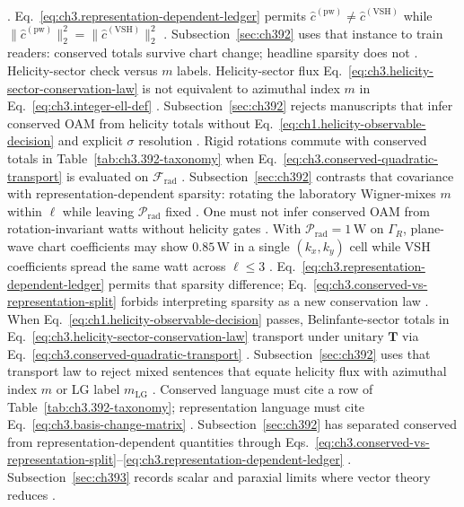\cite{hansen1988}. Eq.~\eqref{eq:ch3.representation-dependent-ledger} permits \(\widehat{c}^{(\mathrm{pw})}\neq\widehat{c}^{(\mathrm{VSH})}\) while \(\|\widehat{c}^{(\mathrm{pw})}\|_{2}^{2}=\|\widehat{c}^{(\mathrm{VSH})}\|_{2}^{2}\)
\cite{poynting1884}. Subsection~\ref{sec:ch392} uses that instance to train readers: conserved totals survive chart change; headline sparsity does not
\cite{belinfante1940}.
Helicity-sector check versus $m$ labels. Helicity-sector flux Eq.~\eqref{eq:ch3.helicity-sector-conservation-law} is not equivalent to azimuthal index \(m\) in Eq.~\eqref{eq:ch3.integer-ell-def}
\cite{belinfante1940}. Subsection~\ref{sec:ch392} rejects manuscripts that infer conserved OAM from helicity totals without Eq.~\eqref{eq:ch1.helicity-observable-decision} and explicit \(\sigma\) resolution
\cite{harrington2001}.
Rigid rotations commute with conserved totals in Table~\ref{tab:ch3.392-taxonomy} when Eq.~\eqref{eq:ch3.conserved-quadratic-transport} is evaluated on \(\mathcal{F}_{\mathrm{rad}}\)
\cite{belinfante1940}. Subsection~\ref{sec:ch392} contrasts that covariance with representation-dependent sparsity: rotating the laboratory Wigner-mixes \(m\) within \(\ell\) while leaving \(\mathcal{P}_{\mathrm{rad}}\) fixed
\cite{hansen1988}. One must not infer conserved OAM from rotation-invariant watts without helicity gates
\cite{belinfante1940}.
With \(\mathcal{P}_{\mathrm{rad}}=1\,\mathrm{W}\) on \(\Gamma_R\), plane-wave chart coefficients may show \(0.85\,\mathrm{W}\) in a single \((k_{x},k_{y})\) cell while VSH coefficients spread the same watt across \(\ell\le3\)
\cite{hansen1988}. Eq.~\eqref{eq:ch3.representation-dependent-ledger} permits that sparsity difference; Eq.~\eqref{eq:ch3.conserved-vs-representation-split} forbids interpreting sparsity as a new conservation law
\cite{poynting1884}.
When Eq.~\eqref{eq:ch1.helicity-observable-decision} passes, Belinfante-sector totals in Eq.~\eqref{eq:ch3.helicity-sector-conservation-law} transport under unitary \(\mathbf{T}\) via Eq.~\eqref{eq:ch3.conserved-quadratic-transport}
\cite{belinfante1940}. Subsection~\ref{sec:ch392} uses that transport law to reject mixed sentences that equate helicity flux with azimuthal index \(m\) or LG label \(m_{\mathrm{LG}}\)
\cite{allen1992}. Conserved language must cite a row of Table~\ref{tab:ch3.392-taxonomy}; representation language must cite Eq.~\eqref{eq:ch3.basis-change-matrix}
\cite{harrington2001}.
Subsection~\ref{sec:ch392} has separated conserved from representation-dependent quantities through
Eqs.~\eqref{eq:ch3.conserved-vs-representation-split}--\eqref{eq:ch3.representation-dependent-ledger}
\cite{belinfante1940}. Subsection~\ref{sec:ch393} records scalar and paraxial limits where vector theory reduces
\cite{jackson1999}.
